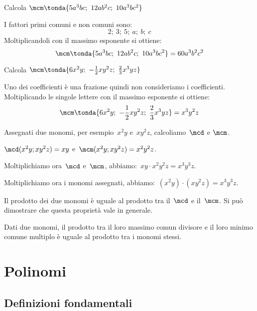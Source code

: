 \begin{exrig}
 \begin{esempio}
Calcola \(\mcm \tonda{5a^{3}bc;~12ab^{2}c;~10a^{3}bc^{2}}\)

I fattori primi comuni e non comuni sono:
\[2;~3;~5;~a;~b;~c\]
Moltiplicandoli con il massimo esponente si ottiene:
\[\mcm \tonda{5a^{3}bc;~12ab^{2}c;~10a^{3}bc^{2}} = 60a^{3}b^{2}c^{2}\]
 \end{esempio}

 \begin{esempio}
Calcola \(\mcm \tonda{6x^{2}y;~-\frac{1}{2}xy^{2}z;~\frac{2}{3}x^{3}yz}\)

Uno dei coefficienti è una frazione quindi non consideriamo i coefficienti.
Moltiplicando le singole lettere con il massimo esponente si ottiene:
\[\mcm \tonda{6x^{2}y;~-\frac{1}{2}xy^{2}z;~\frac{2}{3}x^{3}yz} = 
x^{3}y^{2}z\]
 \end{esempio}
\end{exrig}

Assegnati due monomi, per esempio~$x^{2}y$ e~$xy^{2}z$,
calcoliamo~$\mcd$ e $\mcm$.

$\mcd (x^{2}y;xy^{2}z)=xy$ e~$\mcm (x^{2}y;xy^{2}z)=x^{2}y^{2}z$.

Moltiplichiamo ora~$\mcd$ e~$\mcm$, abbiamo:~$xy\cdot x^{2}y^{2}z= 
x^{3}y^{3}z.$

Moltiplichiamo ora i monomi assegnati, abbiamo:~$(x^{2}y)\cdot 
(xy^{2}z)=x^{3}y^{3}z.$

Il prodotto dei due monomi è uguale al prodotto tra il~$\mcd$ e
il~$\mcm$. Si può dimostrare che questa proprietà vale in generale.

\begin{proprieta}
 Dati due monomi, il prodotto tra il loro massimo comun
divisore e il loro minimo comune multiplo è uguale al prodotto tra i
monomi stessi.
\end{proprieta}


\section{Polinomi}

\subsection{Definizioni fondamentali}
\label{subsec:10_poli_definizioni}

